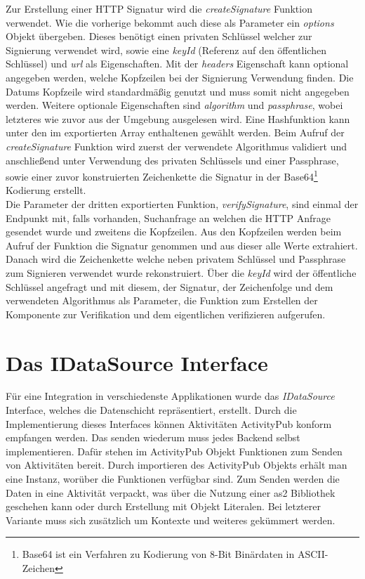 Zur Erstellung einer HTTP Signatur wird die \textit{createSignature} Funktion verwendet. Wie die vorherige bekommt auch diese als Parameter ein \textit{options} Objekt übergeben. Dieses benötigt einen privaten Schlüssel welcher zur Signierung verwendet wird, sowie eine \textit{keyId} (Referenz auf den öffentlichen Schlüssel) und \textit{url} als Eigenschaften. Mit der \textit{headers} Eigenschaft kann optional angegeben werden, welche Kopfzeilen bei der Signierung Verwendung finden. Die Datums Kopfzeile wird standardmäßig genutzt und muss somit nicht angegeben werden. Weitere optionale Eigenschaften sind \textit{algorithm} und \textit{passphrase}, wobei letzteres wie zuvor aus der Umgebung ausgelesen wird. Eine Hashfunktion kann unter den im exportierten Array enthaltenen gewählt werden. Beim Aufruf der \textit{createSignature} Funktion wird zuerst der verwendete Algorithmus validiert und anschließend unter Verwendung des privaten Schlüssels und einer Passphrase, sowie einer zuvor konstruierten Zeichenkette die Signatur in der Base64\footnote{Base64 ist ein Verfahren zu Kodierung von 8-Bit Binärdaten in ASCII-Zeichen} Kodierung erstellt.\\

Die Parameter der dritten exportierten Funktion, \textit{verifySignature}, sind einmal der Endpunkt mit, falls vorhanden, Suchanfrage an welchen die HTTP Anfrage gesendet wurde und zweitens die Kopfzeilen. Aus den Kopfzeilen werden beim Aufruf der Funktion die Signatur genommen und aus dieser alle Werte extrahiert. Danach wird die Zeichenkette welche neben privatem Schlüssel und Passphrase zum Signieren verwendet wurde rekonstruiert. Über die \textit{keyId} wird der öffentliche Schlüssel angefragt und mit diesem, der Signatur, der Zeichenfolge und dem verwendeten Algorithmus als Parameter, die Funktion zum Erstellen der Komponente zur Verifikation und dem eigentlichen verifizieren aufgerufen.

\section{Das IDataSource Interface}
Für eine Integration in verschiedenste Applikationen wurde das \textit{IDataSource} Interface, welches die Datenschicht repräsentiert, erstellt. Durch die Implementierung dieses Interfaces können Aktivitäten ActivityPub konform empfangen werden. Das senden wiederum muss jedes Backend selbst implementieren. Dafür stehen im ActivityPub Objekt Funktionen zum Senden von Aktivitäten bereit. Durch importieren des ActivityPub Objekts erhält man eine Instanz, worüber die Funktionen verfügbar sind. Zum Senden werden die Daten in eine Aktivität verpackt, was über die Nutzung einer \gls{as2} Bibliothek geschehen kann oder durch Erstellung mit Objekt Literalen. Bei letzterer Variante muss sich zusätzlich um Kontexte und weiteres gekümmert werden.\\

